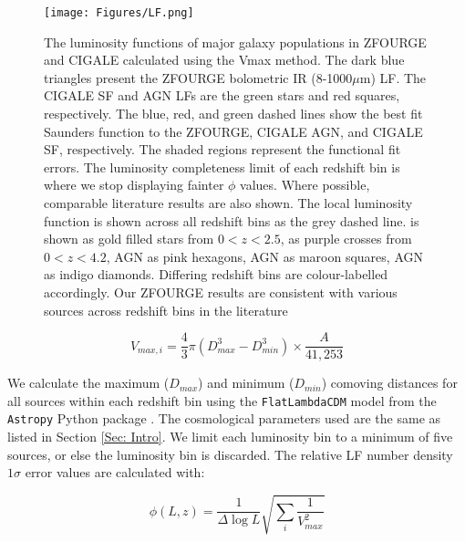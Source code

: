 \begin{figure*}
    \centering
    \texttt{[image: Figures/LF.png]}
    \caption{The luminosity functions of major galaxy populations in ZFOURGE and CIGALE calculated using the Vmax method. The dark blue triangles present the ZFOURGE bolometric IR (8-1000$\mu$m) LF. The CIGALE SF and AGN LFs are the green stars and red squares, respectively. The blue, red, and green dashed lines show the best fit Saunders function \citep{saunders_60-mum_1990} to the ZFOURGE, CIGALE AGN, and CIGALE SF, respectively. The shaded regions represent the functional fit errors. The luminosity completeness limit of each redshift bin is where we stop displaying fainter $\phi$ values. Where possible, comparable literature results are also shown. The local \cite{sanders_iras_2003} luminosity function is shown across all redshift bins as the grey dashed line. \cite{rodighiero_mid-_2010} is shown as gold filled stars from $0 < z < 2.5$, \cite{gruppioni_herschel_2013} as purple crosses from $0 < z < 4.2$, \cite{symeonidis_agn_2021} AGN as pink hexagons, \cite{thorne_deep_2022} AGN as maroon squares, \cite{delvecchio_tracing_2014} AGN as indigo diamonds. Differing redshift bins are colour-labelled accordingly. Our ZFOURGE results are consistent with various sources across redshift bins in the literature \citep{caputi_infrared_2007, huang_local_2007, fu_decomposing_2010}}
    \label{Fig: Bolometric IR LF}
\end{figure*}

\begin{equation}
    \label{EQ: Vmax}
    V_{max,i} = \frac{4}{3} \pi \left(D_{max}^3 - D_{min}^3\right) \times \frac{A}{41,253}
\end{equation}

We calculate the maximum ($D_{max}$) and minimum ($D_{min}$) comoving distances for all sources within each redshift bin using the \texttt{FlatLambdaCDM} model from the \texttt{Astropy} Python package \citep{astropy_collaboration_astropy_2022}. The cosmological parameters used are the same as listed in Section \ref{Sec: Intro}. We limit each luminosity bin to a minimum of five sources, or else the luminosity bin is discarded. The relative LF number density $1\sigma$ error values are calculated with:

\begin{equation} \label{EQ: Vmax Error}
    \phi(L,z) = \frac{1}{\Delta \log L}\sqrt{\sum_i \frac{1}{V_{max}^2}}
\end{equation}


